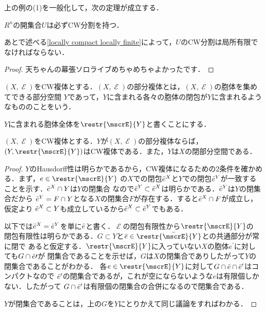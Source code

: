 \documentclass[uplatex]{jsarticle}
\begin{document}
上の例の(1)を一般化して，次の定理が成立する．

\begin{proposition}\label{Euclidean open set CW}
  $R^n$の開集合$U$は必ずCW分割を持つ．
\end{proposition}

あとで述べる\cref{locally compact locally finite}によって，$U$のCW分割は局所有限でなければならない．

\begin{proof}
  天ちゃんの幕張ソロライブめちゃめちゃよかったです．
\end{proof}

\begin{definition}
  $(X,\mscrE)$をCW複体とする．$(X,\mscrE)$の部分複体とは，$(X,\mscrE)$の胞体を集めてできる部分空間
  $Y$であって，$Y$に含まれる各々の胞体の閉包が$Y$に含まれるようなもののことをいう．
\end{definition}

$Y$に含まれる胞体全体を$\restr{\mscrE}{Y}$と書くことにする．

\begin{theorem}
  $(X,\mscrE)$をCW複体とする．$Y$が$(X,\mscrE)$の部分複体ならば，$(Y,\restr{\mscrE}{Y})$はCW複体である．また，$Y$は$X$の閉部分空間である．
\end{theorem}

\begin{proof}
  $Y$のHausdorff性は明らかであるから，CW複体になるための2条件を確かめる．まず，$e\in \restr{\mscrE}{Y}$
  の$X$での閉包$\Bar{e}^X$と$Y$での閉包$\Bar{e}^Y$が一致することを示す．$\Bar{e}^X\cap Y$は$Y$の閉集合
  なので$\Bar{e}^Y\subset \Bar{e}^X$は明らかである．$\Bar{e}^Y$は$Y$の閉集合だから
  $\Bar{e}^Y = F\cap Y$となる$X$の閉集合$F$が存在する．すると$\Bar{e}^X \cap F$が成立し，仮定より
  $\Bar{e}^X\subset Y$も成立しているから$\Bar{e}^X\subset \Bar{e}^Y$でもある．

  以下では$\Bar{e}^X=\Bar{e}^Y$を単に$\Bar{e}$と書く．$\mscrE$の閉包有限性から$\restr{\mscrE}{Y}$の
  閉包有限性は明らかである．$G\subset Y$と$\Bar{e}\in {\restr{\Bar{\mscrE}}{Y}}$との共通部分が常に閉で
  あると仮定する．$\restr{\mscrE}{Y}$に入っていない$X$の胞体$e^\prime$に対しても$G\cap \Bar{e}\prime$が
  閉集合であることを示せば，$G$は$X$の閉集合でありしたがって$Y$の閉集合であることがわかる．
  各$e\in \restr{\mscrE}{Y}$に対して$G\cap \Bar{e} \cap \Bar{e}^\prime$はコンパクトなので
  $\Bar{e}^\prime$の閉集合であるが，これが空にならないような$e$は有限個しかない．したがって
  $G\cap \Bar{e}^\prime$は有限個の閉集合の合併になるので閉集合である．

  $Y$が閉集合であることは，上の$G$を$Y$にとりかえて同じ議論をすればわかる．
\end{proof}
\end{document}
